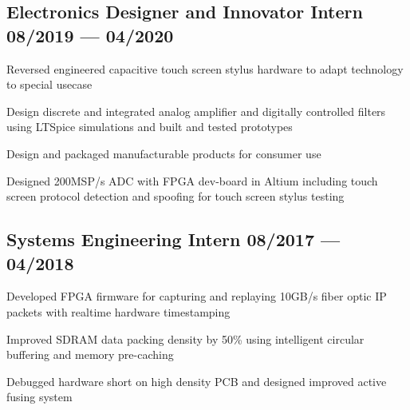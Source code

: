 \documentclass[letter,10pt]{article}
\begin{document}
\subsection{{Electronics Designer and Innovator Intern \hfill 08/2019 --- 04/2020}}
\begin{zitemize}
\item Reversed engineered capacitive touch screen stylus hardware to adapt technology to special usecase
\item Design discrete and integrated analog amplifier and digitally controlled filters using LTSpice simulations and built and tested prototypes
\item Design and packaged manufacturable products for consumer use
\item Designed 200MSP/s ADC with FPGA dev-board in Altium including touch screen protocol detection and spoofing for touch screen stylus testing
\end{zitemize}
{\color{sectiondivide} \vspace{-0.75em}\hrulefill}

\subsection{{Systems Engineering Intern \hfill 08/2017 --- 04/2018}}
\begin{zitemize}
\item Developed FPGA firmware for capturing and replaying 10GB/s fiber optic IP packets with realtime hardware timestamping
\item Improved SDRAM data packing density by 50\% using intelligent circular buffering and memory pre-caching
\item Debugged hardware short on high density PCB and designed improved active fusing system
\end{zitemize}
\end{document}
